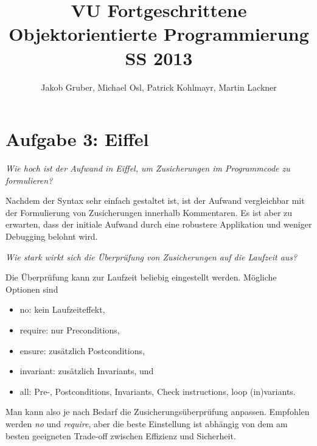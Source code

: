 \documentclass[a4paper,10pt]{article}
\title{VU Fortgeschrittene Objektorientierte Programmierung \\
       SS 2013}
\author{Jakob Gruber,
        Michael Osl,
        Patrick Kohlmayr,
        Martin Lackner}
\begin{document}
\maketitle

\section{Aufgabe 3: Eiffel}


\emph{Wie hoch ist der Aufwand in Eiffel, um Zusicherungen im Programmcode zu 
formulieren?}

\vspace{3mm}

Nachdem der Syntax sehr einfach gestaltet ist, ist der Aufwand vergleichbar mit 
der Formulierung von Zusicherungen innerhalb Kommentaren. Es ist aber zu erwarten,
dass der initiale Aufwand durch eine robustere Applikation und weniger Debugging
belohnt wird.


\emph{Wie stark wirkt sich die Überprüfung von Zusicherungen auf die Laufzeit aus?}

\vspace{3mm}

Die \"Uberpr\"ufung kann zur Laufzeit beliebig eingestellt werden. M\"ogliche Optionen sind

\begin{itemize}
\item no: kein Laufzeiteffekt,
\item require: nur Preconditions,
\item ensure: zus\"atzlich Postconditions,
\item invariant: zus\"atzlich Invariants, und
\item all: Pre-, Postconditions, Invariants, Check instructions, loop (in)variants.
\end{itemize}

Man kann also je nach Bedarf die Zusicherungs\"uberpr\"ufung anpassen. Empfohlen werden
\emph{no} und \emph{require}, aber die beste Einstellung ist abh\"angig von dem am besten
geeigneten Trade-off zwischen Effizienz und Sicherheit.

\vspace{3mm}

\end{document}
